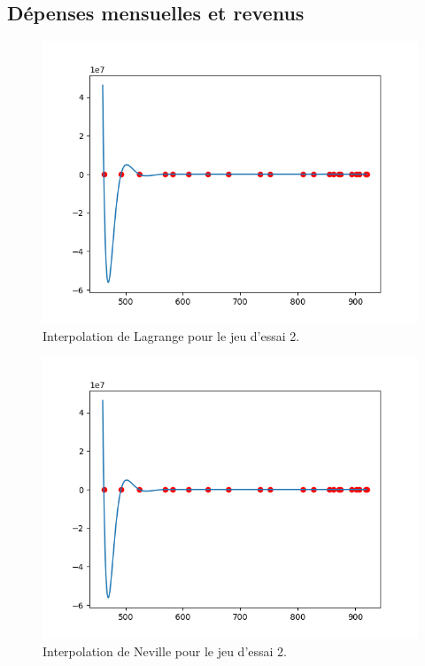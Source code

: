 \documentclass[12pt,french,titlepage]{article}
\begin{document}
	\subsection{Dépenses mensuelles et revenus}
		\begin{figure}[H]
		\includegraphics[width=\textwidth]{"21.png"}
		\caption{Interpolation de Lagrange pour le jeu d'essai 2.}
		\end{figure}
		
		\begin{figure}[H]
		\includegraphics[width=\textwidth]{"22.png"}
		\caption{Interpolation de Neville pour le jeu d'essai 2.}
		\end{figure}
		
\end{document}
